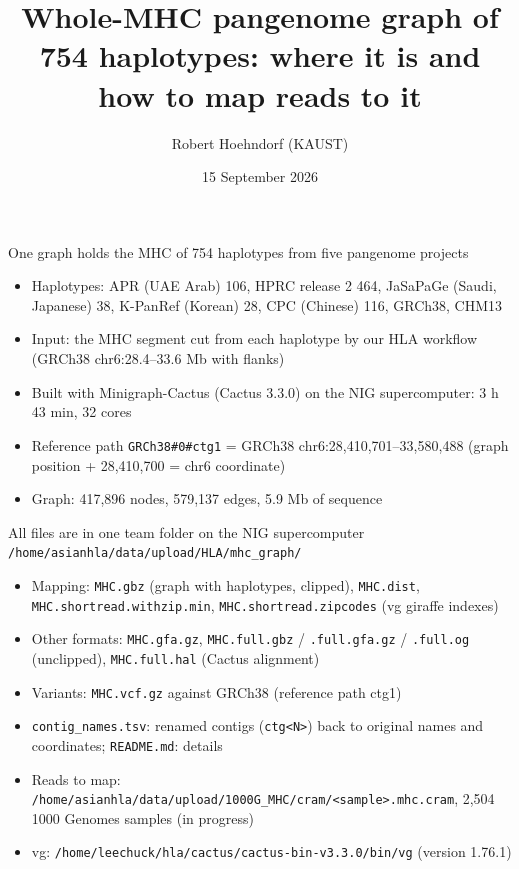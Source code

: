 \documentclass[aspectratio=169,11pt]{beamer}
\title{Whole-MHC pangenome graph of 754 haplotypes: where it is and how to map reads to it}
\author{Robert Hoehndorf (KAUST)}
\institute{BioHackathon Japan 2026, HLA/pangenome group}
\date{15 September 2026}
\begin{document}
\begin{frame}
  \titlepage
\end{frame}

\begin{frame}{One graph holds the MHC of 754 haplotypes from five pangenome projects}
  \begin{itemize}
    \item Haplotypes: APR (UAE Arab) 106, HPRC release 2 464, JaSaPaGe (Saudi, Japanese) 38, K-PanRef (Korean) 28, CPC (Chinese) 116, GRCh38, CHM13
    \item Input: the MHC segment cut from each haplotype by our HLA workflow (GRCh38 chr6:28.4--33.6 Mb with flanks)
    \item Built with Minigraph-Cactus (Cactus 3.3.0) on the NIG supercomputer: 3 h 43 min, 32 cores
    \item Reference path \texttt{GRCh38\#0\#ctg1} = GRCh38 chr6:28,410,701--33,580,488 (graph position + 28,410,700 = chr6 coordinate)
    \item Graph: 417,896 nodes, 579,137 edges, 5.9 Mb of sequence
  \end{itemize}
\end{frame}

\begin{frame}{All files are in one team folder on the NIG supercomputer}
  \texttt{/home/asianhla/data/upload/HLA/mhc\_graph/}
  \begin{itemize}
    \item Mapping: \texttt{MHC.gbz} (graph with haplotypes, clipped), \texttt{MHC.dist}, \texttt{MHC.shortread.withzip.min}, \texttt{MHC.shortread.zipcodes} (vg giraffe indexes)
    \item Other formats: \texttt{MHC.gfa.gz}, \texttt{MHC.full.gbz} / \texttt{.full.gfa.gz} / \texttt{.full.og} (unclipped), \texttt{MHC.full.hal} (Cactus alignment)
    \item Variants: \texttt{MHC.vcf.gz} against GRCh38 (reference path ctg1)
    \item \texttt{contig\_names.tsv}: renamed contigs (\texttt{ctg<N>}) back to original names and coordinates; \texttt{README.md}: details
    \item Reads to map: \texttt{/home/asianhla/data/upload/1000G\_MHC/cram/<sample>.mhc.cram}, 2,504 1000 Genomes samples (in progress)
    \item vg: \texttt{/home/leechuck/hla/cactus/cactus-bin-v3.3.0/bin/vg} (version 1.76.1)
  \end{itemize}
\end{frame}
\end{document}
